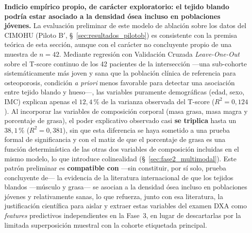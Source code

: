 \documentclass[../tesis.tex]{subfiles}
\begin{document}
\textbf{Indicio empírico propio, de carácter exploratorio: el tejido blando podría estar asociado a
la densidad ósea incluso en poblaciones jóvenes.} La evaluación preliminar de este modelo de
ablación sobre los datos del CIMOHU (Piloto B$'$, §~\ref{sec:resultados_pilotob}) es consistente con
la premisa teórica de esta sección, aunque con el carácter no concluyente propio de una muestra de
$n=42$. Mediante regresión con Validación Cruzada \textit{Leave-One-Out} sobre el T-score
continuo de los 42 pacientes de la intersección ---una sub-cohorte sistemáticamente más joven y
sana que la población clínica de referencia para osteoporosis, condición \textit{a priori} menos
favorable para detectar una asociación entre tejido blando y hueso---, las variables puramente
demográficas (edad, sexo, IMC) explican apenas el $12{,}4$\,\% de la varianza observada del T-score
($R^2 = 0{,}124$). Al incorporar las variables de composición corporal (masa grasa, masa magra y
porcentaje de grasa), el poder explicativo observado casi \textbf{se triplica} hasta un $38{,}1$\,\%
($R^2 = 0{,}381$), sin que esta diferencia se haya sometido a una prueba formal de significancia y
con el matiz de que el porcentaje de grasa es una función determinística de las otras dos
variables de composición incluidas en el mismo modelo, lo que introduce colinealidad
(§~\ref{sec:fase2_multimodal}). Este patrón preliminar es \textbf{compatible con} ---sin
constituir, por sí solo, prueba concluyente de--- la evidencia de la literatura internacional
\parencite{Edwards2015, Oursler2020} de que los tejidos blandos ---músculo y grasa--- se asocian
a la densidad ósea incluso en poblaciones jóvenes y relativamente sanas, lo que refuerza, junto con
esa literatura, la justificación científica para aislar y extraer estas variables del examen DXA
como \textit{features} predictivos independientes en la Fase~3, en lugar de descartarlas por la
limitada superposición muestral con la cohorte etiquetada principal.
\end{document}
